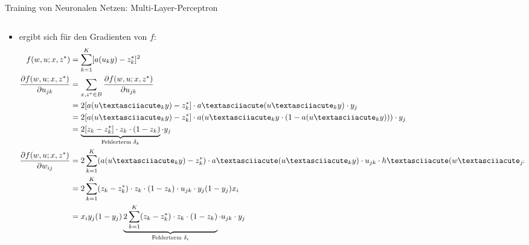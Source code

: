 \documentclass[aspectratio=1610, xcolor=dvipsnames, 9pt]{beamer}
\begin{document}
      \begin{frame}{Training von Neuronalen Netzen: Multi-Layer-Perceptron}
        \begin{columns}
          \begin{column}{1\textwidth}
            \begin{itemize}

            \item ergibt sich für den Gradienten von $f$:
            \begin{align*}
              f(w,u;x,z^*) &= \sum_{k=1} ^K [a(u_k y) - z^*_k]^2 \\
              \frac{\partial f(w,u; x,z^*) }{ \partial u_{jk} } &= \sum_{x,z^* \in B} \frac{\partial f(w,u;x,z^*)}{\partial u_{jk}} \\
                                                            &= 2 [a(u´_k y)-z^*_k] \cdot a´(u´_k y) \cdot y_j \\
                                                            &= 2 [a(u´_k y)-z^*_k] \cdot a(u´_k y \cdot (1 - a(u´_k y)))\cdot y_j\\
                                                            &=  \underbrace{ 2 [z_k - z^*_k] \cdot z_k \cdot (1- z_k) }_\text{Fehlerterm $ \delta_k$} \cdot y_j \\
               \frac{\partial f(w,u; x,z^*)}{\partial w_{ij}} &= 2 \sum_{k=1} ^K (a(u´_k y) -z^*_k) \cdot a´(u´_k y) \cdot u_{jk} \cdot h´(w´_j x) x_i \\
                                                             &= 2 \sum_{k=1} ^K ( z_k -z^*_k) \cdot z_k \cdot (1-z_k) \cdot u_{jk} \cdot y_j (1-y_j) x_i \\                                                            
                                                             &= x_i y_j (1-y_j)  \underbrace{2 \sum_{k=1} ^K ( z_k -z^*_k) \cdot z_k \cdot (1-z_k) }_\text{Fehlerterm $ \delta_i$} \cdot u_{jk} \cdot y_j 
            \end{align*}
            \end{itemize}
          \end{column}
        \end{columns}
      \end{frame}
\end{document}

